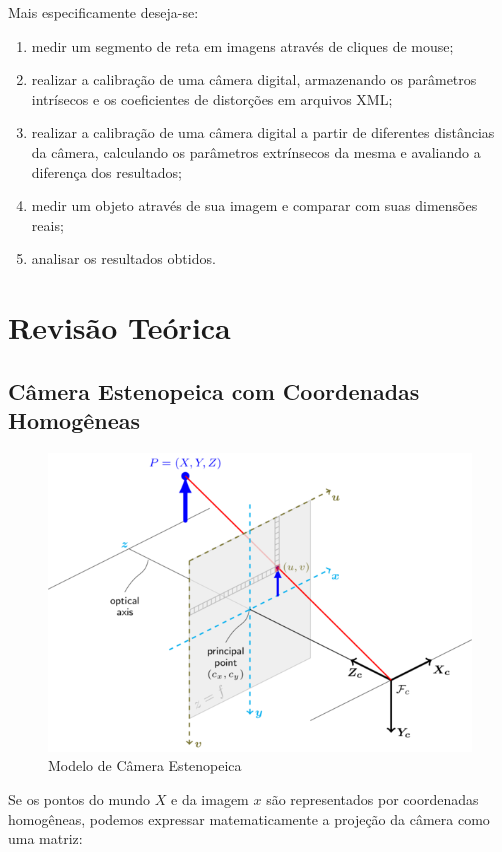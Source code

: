 \documentclass[conference]{IEEEtran}
\begin{document}
Mais especificamente deseja-se:
\begin{enumerate}
\item medir um segmento de reta em imagens através de cliques de mouse;
\item realizar a calibração de uma câmera digital, armazenando os parâmetros intrísecos e os coeficientes de distorções em arquivos XML;
\item realizar a calibração de uma câmera digital a partir de diferentes distâncias da câmera, calculando os parâmetros extrínsecos da mesma e avaliando a diferença dos resultados;
\item medir um objeto através de sua imagem e comparar com suas dimensões reais;
\item analisar os resultados obtidos.
\end{enumerate}
\section{Revisão Teórica}

\subsection{Câmera Estenopeica com Coordenadas Homogêneas}

\begin{figure}[ht!]
\begin{center}
\includegraphics[width=.75\columnwidth]{pinhole.png}
\caption{Modelo de Câmera Estenopeica\cite{docsopencv}}
\end{center}
\end{figure}

Se os pontos do mundo \(X\) e da imagem \(x\) são representados por coordenadas homogêneas, podemos expressar matematicamente a projeção da câmera como uma matriz\cite{tese}:
\end{document}
